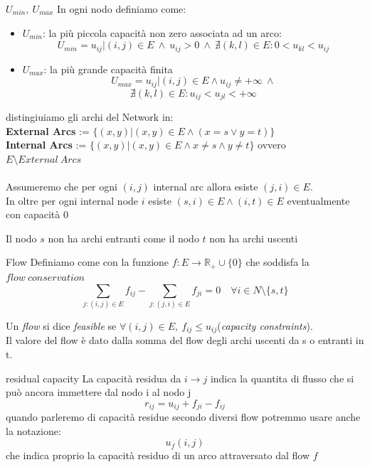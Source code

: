\documentclass[a4paper, 11pt]{report}
\begin{document}
\begin{definition}{$U_{min},\ U_{max}$}{}
    In ogni nodo definiamo come:
    \begin{itemize}
        \item $U_{min}$: la più piccola capacità non zero associata ad un arco:
        \[U_{min} = u_{ij} | (i,j) \in E\ \land\ u_{ij} > 0\ \land\ \nexists (k,l) \in E : 0<u_{kl}<u_{ij}\]
        \item $U_{max}$: la più grande capacità finita 
        \[U_{max} = u_{ij}| (i,j) \in E\land u_{ij} \not = + \infty\ \land \]
        \[\nexists (k,l) \in E : u_{ij}< u_{jl} < +\infty \]
    \end{itemize}
\end{definition}
distingiuiamo gli archi del Network in:\\
\textbf{External Arcs} := $\{(x,y) | (x,y)\in E \land (x = s \lor y = t)\}$\\
\textbf{Internal Arcs} := $\{(x,y) | (x,y)\in E \land x \not = s \land y \not = t\}$ ovvero $E \setminus External\ Arcs$\\
\\
Assumeremo che per ogni $(i,j)$ internal arc allora esiste $(j,i) \in E$.\\ In oltre per ogni internal node $i$ esiste $(s,i) \in E \land (i,t) \in E$ eventualmente con capacità 0
\begin{obs}{}{}
    Il nodo $s$ non ha archi entranti come il nodo $t$ non ha archi uscenti
\end{obs}

\begin{definition}{Flow}{}
    Definiamo come con la funzione $f: E \rightarrow\mathbb{R}_+ \cup \{0\}$ che soddisfa la $flow\ conservation$
    \[\sum_{j:(i,j) \in E} f_{ij} - \sum_{j:(j,i) \in E}f_{ji} = 0 \quad \forall i \in N\setminus\{s,t\}\]
\end{definition}

Un \textit{flow} si dice \textit{feasible} se $\forall (i,j) \in E,\ f_{ij} \le u_{ij}$(\textit{capacity constraints}).\\
Il valore del flow è dato dalla somma del flow degli archi uscenti da s o entranti in t.  
\begin{definition}{residual capacity}{}
    La capacità residua da $i \rightarrow j$ indica la quantita di flusso che si può ancora immettere dal nodo i al nodo j
    \[r_{ij} = u_{ij} + f_{ji} - f_{ij}\]    
    quando parleremo di capacità residue secondo diversi flow potremmo usare anche la notazione:
    \[u_f(i,j)\]
    che indica proprio la capacità residuo di un arco attraversato dal flow $f$
\end{definition}
\end{document}
